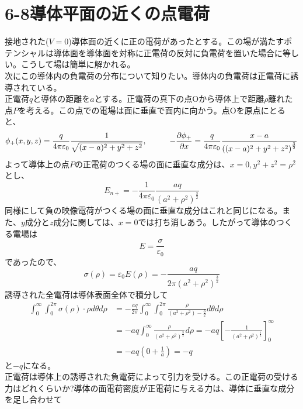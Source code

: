 \documentclass{jsarticle}
\begin{document}
\newpage
\section*{6-8\hspace{5mm}導体平面の近くの点電荷}
\noindent
接地された(\(V=0\))導体面の近くに正の電荷があったとする。この場が満たすポテンシャルは導体面を導体面を対称に正電荷の反対に負電荷を置いた場合に等しい。こうして場は簡単に解かれる。\\
次にこの導体内の負電荷の分布について知りたい。導体内の負電荷は正電荷に誘導されている。\\
正電荷\(q\)と導体の距離を\(a\)とする。正電荷の真下の点Oから導体上で距離\(\rho\)離れた点\(P\)を考える。この点での電場は面に垂直で面内に向かう。点Oを原点にとると、
\[\phi_{+}(x,y,z)=\frac{q}{4\pi\varepsilon_{0}}\frac{1}{\sqrt{(x-a)^{2}+y^{2}+z^{2}}},\hspace{10mm}-\frac{\partial\phi_{+}}{\partial x}=\frac{q}{4\pi\varepsilon_{0}}\frac{x-a}{\left((x-a)^{2}+y^{2}+z^{2}\right)^{\frac{3}{2}}}\]
よって導体上の点\(P\)の正電荷のつくる場の面に垂直な成分は、\(x=0,y^2+z^2=\rho^2\)とし、
\begin{equation}
E_{n+}=-\frac{1}{4\pi\varepsilon_{0}}\frac{aq}{\left(a^{2}+\rho^{2}\right)^{\frac{3}{2}}}
\end{equation}
同様にして負の映像電荷がつくる場の面に垂直な成分はこれと同じになる。また、\(y\)成分と\(z\)成分に関しては、\(x=0\)では打ち消しあう。したがって導体のつくる電場は
\[E=\frac{\sigma}{\varepsilon_{0}}\]
であったので、
\begin{equation}
\sigma(\rho)=\varepsilon_{0}E(\rho)=-\frac{aq}{2\pi(a^{2}+\rho^{2})^{\frac{3}{2}}}
\end{equation}
誘導された全電荷は導体表面全体で積分して
\begin{align*}
\int_{0}^{\infty}\int_{0}^{2\pi}\sigma(\rho)\cdot\rho d\theta d\rho&=-\frac{aq}{2\pi}\int_{0}^{\infty}\int_{0}^{2\pi}\frac{\rho}{(a^{2}+\rho^{2})-{\frac{3}{2}}}d\theta d\rho\\
&=-aq\int_{0}^{\infty}\frac{\rho}{(a^{2}+\rho^{2})^{\frac{3}{2}}}d\rho=-aq\left[-\frac{1}{(a^{2}+\rho^{2})^{\frac{1}{2}}}\right]_{0}^{\infty}\\
&=-aq\left(0+\frac{1}{a}\right)=-q
\end{align*}
と\(-q\)になる。\\
正電荷は導体上の誘導された負電荷によって引力を受ける。この正電荷の受ける力はどれくらいか?導体の面電荷密度が正電荷に与える力は、導体に垂直な成分を足し合わせて
\end{document}
